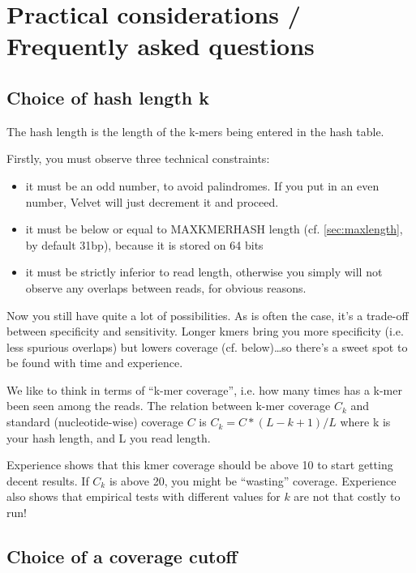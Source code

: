 \documentclass{article}
\begin{document}
\section{Practical considerations / Frequently asked questions} 

\subsection{Choice of hash length k}

\label{sec:kmercov}

The hash length is the length of the k-mers being entered in the hash table.

Firstly, you must observe three technical constraints:
\begin{itemize}
\item it must be an odd number, to avoid palindromes. If you put in an even number, Velvet will just decrement it and proceed.
\item it must be below or equal to MAXKMERHASH length (cf. \ref{sec:maxlength}, by default 31bp), because it is stored on 64 bits
\item it must be strictly inferior to read length, otherwise you simply will not observe any overlaps between reads, for obvious reasons.
\end{itemize}

Now you still have quite a lot of possibilities. As is often the case, it's a trade-off between specificity and sensitivity. Longer kmers bring you more specificity (i.e. less spurious overlaps) but lowers coverage (cf. below)\ldots so there's a sweet spot to be found with time and experience.

We like to think in terms of ``k-mer coverage'', i.e. how many times has a k-mer been seen among the reads. The relation between k-mer coverage $C_k$ and standard (nucleotide-wise) coverage $C$ is $C_k = C * (L - k + 1) / L$ where k is your hash length, and L you read length. 

Experience shows that this kmer coverage should be above 10 to start getting decent results. If $C_k$ is above 20, you might be ``wasting'' coverage. Experience also shows that empirical tests with different values for $k$ are not that costly to run!

\subsection{Choice of a coverage cutoff}

\label{sec:covcutoff}
\end{document}
